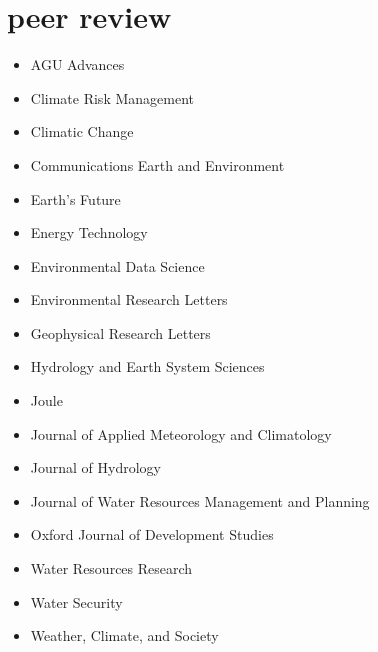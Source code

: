 \documentclass[10pt,oneside]{article}
\begin{document}

\section{peer review}

\mbox{}\vspace{-\dimexpr\baselineskip\relax}

\begin{itemize}[label={}]

  \item AGU Advances

  \item Climate Risk Management

  \item Climatic Change

  \item Communications Earth and Environment

  \item Earth's Future

  \item Energy Technology

  \item Environmental Data Science

  \item Environmental Research Letters

  \item Geophysical Research Letters

  \item Hydrology and Earth System Sciences

  \item Joule

  \item Journal of Applied Meteorology and Climatology

  \item Journal of Hydrology

  \item Journal of Water Resources Management and Planning

  \item Oxford Journal of Development Studies

  \item Water Resources Research

  \item Water Security

  \item Weather, Climate, and Society

\end{itemize}
\end{document}
